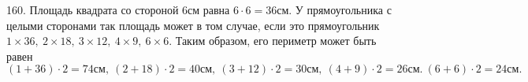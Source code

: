 160. Площадь квадрата со стороной 6см равна $6\cdot6=36$см. У прямоугольника с целыми сторонами так площадь может в том случае, если это прямоугольник $1\times36,\ 2\times18,\ 3\times12,\ 4\times9,\ 6\times6.$ Таким образом, его периметр может быть равен $(1+36)\cdot2=74\text{см},\ (2+18)\cdot2=40\text{см},\ (3+12)\cdot2=30\text{см},\ (4+9)\cdot2=26\text{см}.\ (6+6)\cdot2=24\text{см}.$\\
